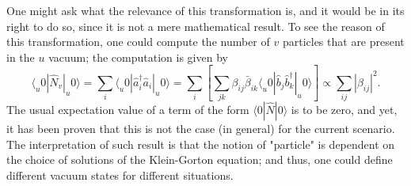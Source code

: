 One might ask what the relevance of this transformation is, and it would be in its right to do so, since it is not a mere mathematical result. To see the reason of this transformation, one could compute the number of $v$ particles that are present in the $u$ vacuum; the computation is given by
\begin{equation}\label{eq: Bogoliubov Number particles general}
	\langle_u0|\hat{N}_v|_u0\rangle=\sum_i\langle_u0|\hat{a}_i^\dagger\hat{a}_i|_u0\rangle=\sum_{i}\left[\sum_{jk}\beta_{ij}\bar \beta_{ik}\langle_u0|\hat{b}_j\hat{b}_k^\dagger|_u0\rangle\right]\propto \sum_{ij}|\beta_{ij}|^2.
\end{equation}
The usual expectation value of a term of the form $\langle0|\hat{N}|0\rangle$ is to be zero, and yet, it has been proven that this is not the case (in general) for the current scenario. The interpretation of such result is that the notion of "particle" is dependent on the choice of solutions of the Klein-Gorton equation; and thus, one could define different vacuum states for different situations.

